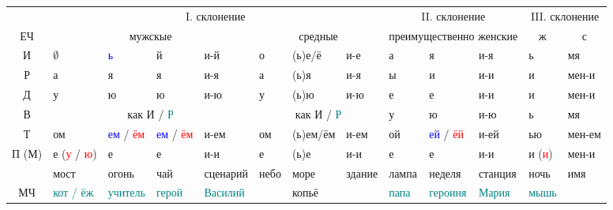\documentclass[a4paper, landscape, 11pt]{article}
\newcommand{\an}[1]{\textcolor{teal}{#1}} %
\newcommand{\us}[1]{\textcolor{blue}{#1}} %
\newcommand{\st}[1]{\textcolor{red}{#1}}  %
\begin{document}
\begin{tabularx}{\textwidth}{|c|XXXX|XXX|XXX|XX|}
	\hline
	\strut &                                        \multicolumn{7}{c|}{I. склонение}                                         &      \multicolumn{3}{c|}{II. склонение}      &      \multicolumn{2}{c|}{III. склонение}       \\
	  ЕЧ   &                        \multicolumn{4}{c}{мужскые}                         &    \multicolumn{3}{c|}{средные}     & \multicolumn{3}{c|}{преимущественно женские} & \multicolumn{1}{c}{ж} & \multicolumn{1}{c|}{с} \\ \hline
	  И    & $\emptyset$         & \us{ь}            & й                 & и-й          & о           & (ь)е/ё   & и-е        & а           & я                 & и-я        & ь                     & мя                     \\
	  Р    & а                   & я                 & я                 & и-я          & а           & (ь)я     & и-я        & ы           & и                 & и-и        & и                     & мен-и                  \\
	  Д    & у                   & ю                 & ю                 & и-ю          & у           & (ь)ю     & и-ю        & е           & е                 & и-и        & и                     & мен-и                  \\ \cline{2-8}
	  В    &                    \multicolumn{4}{c|}{как И / \an{Р}}                     & \multicolumn{3}{c|}{как И / \an{Р}} & у           & ю                 & и-ю        & ь                     & мя                     \\ \cline{2-8}
	  Т    & ом                  & \us{ем} / \st{ём} & \us{ем} / \st{ём} & и-ем         & ом          & (ь)ем/ём & и-ем       & ой          & \us{ей} / \st{ёй} & и-ей       & ью                    & мен-ем                 \\
	П (М)  & е (\st{у} / \st{ю}) & е                 & е                 & и-и          & е           & (ь)е     & и-и        & е           & е                 & и-и        & и (\st{и})            & мен-и                  \\ \hline
	\strut & мост                & огонь             & чай               & сценарий     & небо        & море     & здание     & лампа       & неделя            & станция    & ночь                  & имя                    \\
	  МЧ   & \an{кот / ёж}       & \an{учитель}      & \an{герой}        & \an{Василий} & \strut      & копьё    & \strut     & \an{папа}   & \an{героиня}      & \an{Мария} & \an{мышь}             & \strut                 \\ \hline

\end{tabularx}
\end{document}
